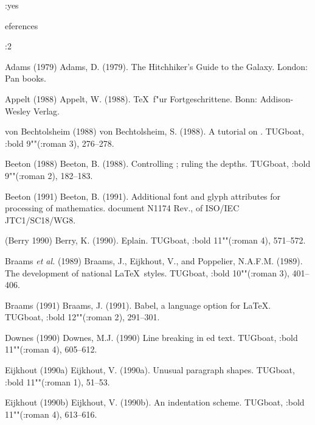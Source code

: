 \Shallow:yes
\subject References


\def\book#1{{\italic #1}}
\def\magz#1{{\italic #1}}
\def\AW{Reading, MA: Addison-Wesley}
\def\PhD{Ph.D. thesis}
\def\volis#1#2{{\Style:bold #1}""({\Style:roman #2})}
\ClearFor:2


\comment
\item[HH] Adams (1979)
 Adams, D. (1979). \book{The Hitchhiker's Guide to the Galaxy}. 
London: Pan books.
\endcomment

\item[Appelt] Appelt (1988)
 Appelt, W. (1988).
\book{\TeX\ f"ur Fortgeschrittene}.
Bonn: Addison-Wesley Verlag.

\item[svb:future] von Bechtolsheim (1988)
 von Bechtolsheim, S. (1988).
A tutorial on .
\magz{TUGboat}, \volis93, 276--278.

\item[B:ctrl-M] Beeton (1988)
 Beeton, B. (1988).
Controlling ; ruling the depths.
\magz{TUGboat}, \volis92, 182--183.

\item[BB:ISO] Beeton (1991)
 Beeton, B. (1991). 
\book{Additional font and glyph attributes for processing 
of mathematics}.
document N1174 Rev.,
of ISO/IEC JTC1/SC18/WG8.

\item[Berry] (Berry 1990)
 Berry, K. (1990).
Eplain. \magz{TUGboat}, \volis{11}4,
571--572.

\item[BEP] Braams {\protect\it et al.} (1989)
 Braams, J., Eijkhout, V., and Poppelier, N.A.F.M. (1989).
The development of national \LaTeX\ styles. \magz{TUGboat}, \volis{10}3,
401--406.

\item[Babel] Braams (1991)
 Braams, J. (1991).
Babel, a language option for \LaTeX. \magz{TUGboat}, 
\volis{12}2, 291--301.

\item[Downs] Downes (1990)
 Downes, M.J. (1990)
Line breaking in ed text.
\magz{TUGboat}, \volis{11}4, 605--612.

\item[E1] Eijkhout (1990a)
 Eijkhout, V. (1990a).
Unusual paragraph shapes.
\magz{TUGboat}, \volis{11}1, 51--53.

\item[E3] Eijkhout (1990b)
 Eijkhout, V. (1990b).
An indentation scheme. \magz{TUGboat}, \volis{11}4, 613--616.


